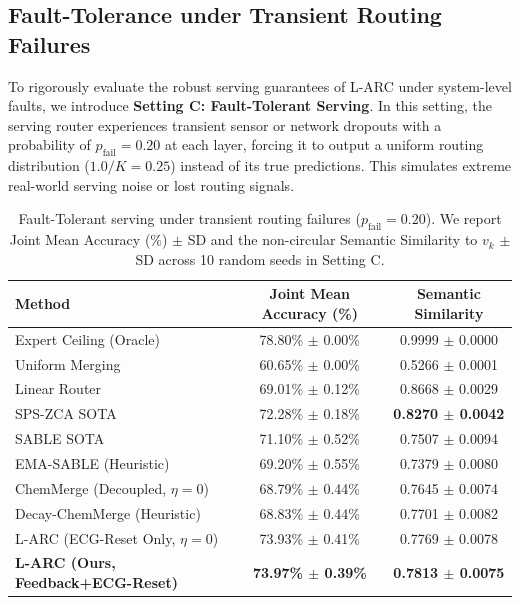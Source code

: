 \subsection{Fault-Tolerance under Transient Routing Failures}
\label{sec:fault_tolerance}

To rigorously evaluate the robust serving guarantees of L-ARC under system-level faults, we introduce \textbf{Setting C: Fault-Tolerant Serving}. In this setting, the serving router experiences transient sensor or network dropouts with a probability of $p_{\text{fail}} = 0.20$ at each layer, forcing it to output a uniform routing distribution ($1.0/K = 0.25$) instead of its true predictions. This simulates extreme real-world serving noise or lost routing signals.

\begin{table}[h]
\caption{Fault-Tolerant serving under transient routing failures ($p_{\text{fail}} = 0.20$). We report Joint Mean Accuracy (\%) $\pm$ SD and the non-circular Semantic Similarity to $v_k$ $\pm$ SD across 10 random seeds in Setting C.}
\label{tab:fault_results}
\vskip 0.15in
\begin{center}
\begin{small}
\begin{tabular}{lcc}
\toprule
Method & Joint Mean Accuracy (\%) & Semantic Similarity \\
\midrule
Expert Ceiling (Oracle) & 78.80\% $\pm$ 0.00\% & 0.9999 $\pm$ 0.0000 \\
Uniform Merging & 60.65\% $\pm$ 0.00\% & 0.5266 $\pm$ 0.0001 \\
Linear Router & 69.01\% $\pm$ 0.12\% & 0.8668 $\pm$ 0.0029 \\
SPS-ZCA SOTA \cite{spszca2025} & 72.28\% $\pm$ 0.18\% & \textbf{0.8270 $\pm$ 0.0042} \\
SABLE SOTA \cite{sable2025} & 71.10\% $\pm$ 0.52\% & 0.7507 $\pm$ 0.0094 \\
EMA-SABLE (Heuristic) & 69.20\% $\pm$ 0.55\% & 0.7379 $\pm$ 0.0080 \\
ChemMerge (Decoupled, $\eta=0$) & 68.79\% $\pm$ 0.44\% & 0.7645 $\pm$ 0.0074 \\
Decay-ChemMerge (Heuristic) & 68.83\% $\pm$ 0.44\% & 0.7701 $\pm$ 0.0082 \\
L-ARC (ECG-Reset Only, $\eta=0$) & 73.93\% $\pm$ 0.41\% & 0.7769 $\pm$ 0.0078 \\
\midrule
\textbf{L-ARC (Ours, Feedback+ECG-Reset)} & \textbf{73.97\% $\pm$ 0.39\%} & \textbf{0.7813 $\pm$ 0.0075} \\
\bottomrule
\end{tabular}
\end{small}
\end{center}
\vskip -0.1in
\end{table}

